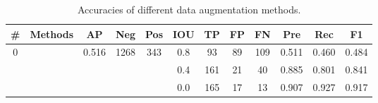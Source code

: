 \documentclass[preprint,12pt,authoryear]{elsarticle}
\begin{document}
\begin{table}
\footnotesize
\caption{Accuracies of different data augmentation methods.}
\label{table_acc_imgaug}
\begin{tabular}{c c c c  c ccc c c c c}
\toprule
\textbf{\#}&\textbf{Methods}&\textbf{AP}&\textbf{Neg}&\textbf{Pos}&\textbf{IOU}&\textbf{TP}&\textbf{FP}&\textbf{FN}&\textbf{Pre}&\textbf{Rec}&\textbf{F1}\\
\midrule

\multirow{3}{*}{0} &  \multirow{3}{*}{} & \multirow{3}{*}{0.516} & \multirow{3}{*}{1268} & \multirow{3}{*}{343} &0.8 & 93	&89	&109&	0.511 &	0.460& 	0.484  \\
 &  & &  &   & 0.4 & 161&	21	&40	&0.885 &	0.801 &	0.841  \\
 &  & &  &   & 0.0 & 165&	17	&13&	0.907 	&0.927 	&0.917  \\

\hline
\hline


\end{tabular}
\end{table}
\end{document}
